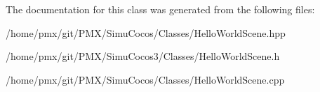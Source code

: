 The documentation for this class was generated from the following files\+:\begin{DoxyCompactItemize}
\item 
/home/pmx/git/\+P\+M\+X/\+Simu\+Cocos/\+Classes/Hello\+World\+Scene.\+hpp\item 
/home/pmx/git/\+P\+M\+X/\+Simu\+Cocos3/\+Classes/Hello\+World\+Scene.\+h\item 
/home/pmx/git/\+P\+M\+X/\+Simu\+Cocos/\+Classes/Hello\+World\+Scene.\+cpp\end{DoxyCompactItemize}
